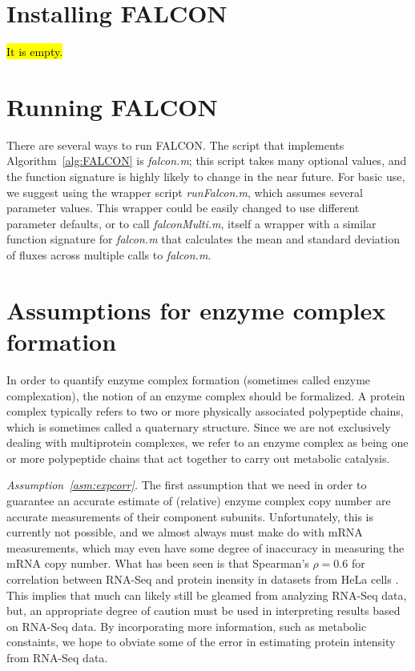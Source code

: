\section{Installing FALCON}

\hl {It is empty.}

\section{Running FALCON}

There are several ways to run FALCON. The script that implements
Algorithm~\ref{alg:FALCON} is \textit{falcon.m}; this script takes
many optional values, and the function signature is highly likely
to change in the near future. For basic use, we suggest using
the wrapper script \textit{runFalcon.m}, which assumes several
parameter values. This wrapper could be easily changed to use
different parameter defaults, or to call \textit{falconMulti.m},
itself a wrapper with a similar function signature for
\textit{falcon.m} that calculates the mean and standard deviation of
fluxes across multiple calls to \textit{falcon.m}.

\section{Assumptions for enzyme complex formation}
\label{sec:complexation}

In order to quantify enzyme complex formation (sometimes called enzyme
complexation), the notion of an enzyme complex should be formalized.
A protein complex typically refers to two or more physically
associated polypeptide chains, which is sometimes called a quaternary
structure. Since we are not exclusively dealing with multiprotein
complexes, we refer to an enzyme complex as being one or more
polypeptide chains that act together to carry out metabolic
catalysis.

\emph{Assumption~\ref{asm:expcorr}.}  The first assumption that we
need in order to guarantee an accurate estimate of (relative) enzyme
complex copy number are accurate measurements of their component
subunits. Unfortunately, this is currently not possible, and we almost
always must make do with mRNA measurements, which may even have some
degree of inaccuracy in measuring the mRNA copy number. What has been
seen is that Spearman's $\rho = 0.6$ for correlation between RNA-Seq
and protein inensity in datasets from HeLa cells
\citep{Nagaraj2011}. This implies that much can likely still be
gleamed from analyzing RNA-Seq data, but, an appropriate degree of
caution must be used in interpreting results based on RNA-Seq data. By
incorporating more information, such as metabolic constaints, we hope
to obviate some of the error in estimating protein intensity from
RNA-Seq data. 

